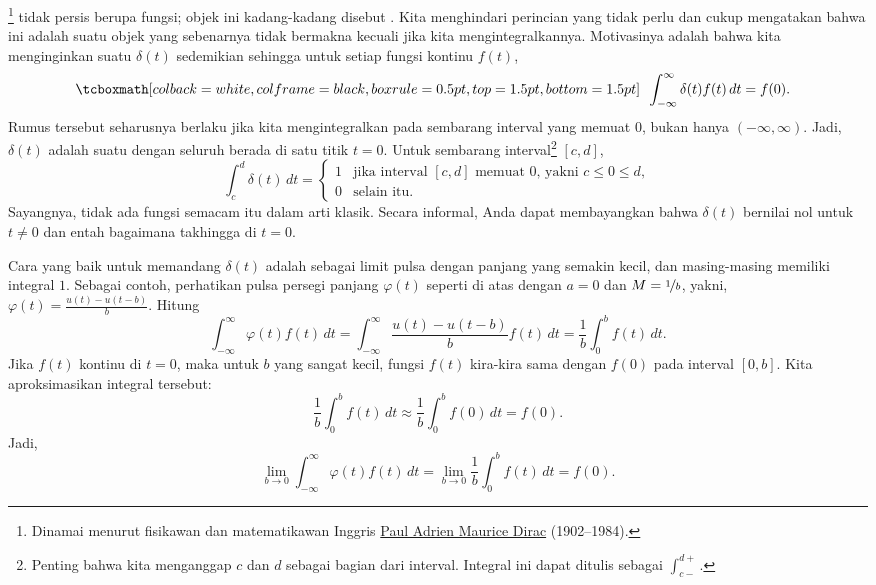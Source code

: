 \emph{}%
\footnote{Dinamai menurut fisikawan dan matematikawan Inggris
\href{https://en.wikipedia.org/wiki/Paul_Dirac}{Paul Adrien Maurice Dirac}
(1902--1984).}
tidak persis berupa fungsi; objek ini kadang-kadang disebut
\emph{}.  Kita
menghindari perincian yang tidak perlu dan cukup mengatakan bahwa ini adalah suatu objek
yang sebenarnya tidak bermakna kecuali jika kita mengintegralkannya.  Motivasinya adalah
bahwa kita menginginkan suatu  $\delta(t)$
sedemikian sehingga 
untuk setiap fungsi kontinu $f(t)$,
\begin{equation*}
\mybxbg{~~
\int_{-\infty}^\infty \delta(t) f(t) \,dt = f(0) .
~~}
\end{equation*}
Rumus tersebut seharusnya berlaku jika kita mengintegralkan pada sembarang interval yang memuat 0,
bukan hanya $(-\infty,\infty)$.
Jadi, $\delta(t)$ adalah suatu  
dengan seluruh  berada di satu titik $t=0$.  Untuk sembarang
interval\footnote{%
Penting bahwa kita menganggap $c$ dan $d$ sebagai bagian dari
interval.  Integral ini dapat ditulis sebagai $\int_{c-}^{d+}$.}
$[c,d]$,
\begin{equation*}
\int_c^d \delta(t) \,dt = 
\begin{cases}
1 & \text{jika interval $[c,d]$ memuat 0, yakni\ } c \leq 0 \leq d, \\
0 & \text{selain itu.}
\end{cases}
\end{equation*}
Sayangnya, tidak ada fungsi semacam itu dalam arti klasik.  Secara
informal, Anda dapat membayangkan bahwa $\delta(t)$ bernilai nol untuk $t \neq 0$ dan entah bagaimana
takhingga di $t=0$.

Cara yang baik untuk memandang $\delta(t)$ adalah sebagai limit pulsa
dengan panjang yang semakin kecil,
dan masing-masing memiliki integral $1$.  Sebagai contoh, 
perhatikan pulsa persegi panjang
$\varphi(t)$ seperti di atas dengan $a=0$ dan
$M=\nicefrac{1}{b}$, yakni, $\varphi(t) = \frac{u(t) - u(t-b)}{b}$.
Hitung
\begin{equation*}
\int_{-\infty}^\infty \varphi(t) f(t) \,dt =
\int_{-\infty}^\infty \frac{u(t) - u(t-b)}{b} f(t) \,dt =
\frac{1}{b} \int_{0}^b f(t) \,dt .
\end{equation*}
Jika $f(t)$ kontinu di $t=0$, maka
untuk $b$ yang sangat kecil, fungsi $f(t)$ kira-kira sama dengan $f(0)$ pada
interval $[0,b]$.  Kita aproksimasikan integral tersebut:
\begin{equation*}
\frac{1}{b} \int_{0}^b f(t) \,dt \approx
\frac{1}{b} \int_{0}^b f(0) \,dt = f(0) .
\end{equation*}
Jadi,
\begin{equation*}
\lim_{b\to 0}
\int_{-\infty}^\infty \varphi(t) f(t) \,dt =
\lim_{b\to 0}
\frac{1}{b} \int_{0}^b f(t) \,dt  = f(0) .
\end{equation*}

